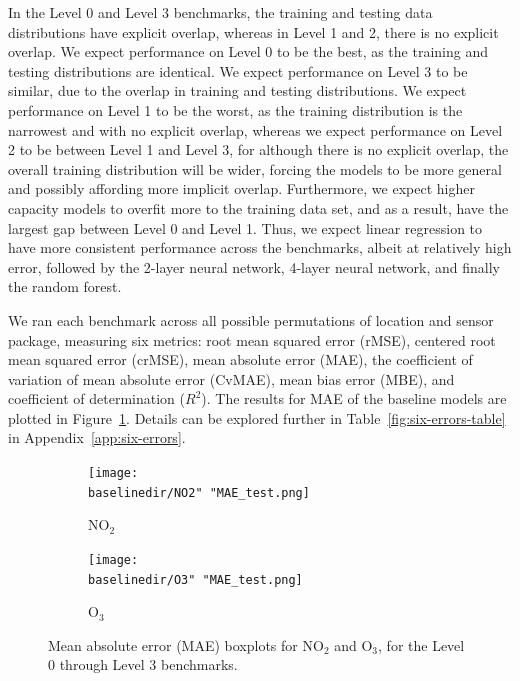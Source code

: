 \documentclass[journal abbreviation, manuscript]{copernicus}
\newcommand{\textus}[1]{$_{\text{#1}}$}
\begin{document}
In the Level 0 and Level 3 benchmarks, the training and testing data distributions have explicit overlap, whereas in Level 1 and 2, there is no explicit overlap. We expect performance on Level 0 to be the best, as the training and testing distributions are identical.  We expect performance on Level 3 to be similar, due to the overlap in training and testing distributions. We expect performance on Level 1 to be the worst, as the training distribution is the narrowest and with no explicit overlap, whereas we expect performance on Level 2 to be between Level 1 and Level 3, for although there is no explicit overlap, the overall training distribution will be wider, forcing the models to be more general and possibly affording more implicit overlap.  Furthermore, we expect higher capacity models to overfit more to the training data set, and as a result, have the largest gap between Level 0 and Level 1. Thus, we expect linear regression to have more consistent performance across the benchmarks, albeit at relatively high error, followed by the 2-layer neural network, 4-layer neural network, and finally the random forest.

We ran each benchmark across all possible permutations of location and sensor package, measuring six metrics: root mean squared error (rMSE), centered root mean squared error (crMSE), mean absolute error (MAE), the coefficient of variation of mean absolute error (CvMAE), mean bias error (MBE), and coefficient of determination ($R^2$). The results for MAE of the baseline models are plotted in Figure~\ref{fig:results-linear}.  Details can be explored further in Table~\ref{fig:six-errors-table} in Appendix~\ref{app:six-errors}.

\begin{figure}[t]
\centering
\begin{subfigure}{0.45\textwidth}
\texttt{[image: \\baselinedir/NO2" "MAE\_test.png]}
\caption{NO\textus{2}}
\end{subfigure}
\begin{subfigure}{0.45\textwidth}
\texttt{[image: \\baselinedir/O3" "MAE\_test.png]}
\caption{O\textus{3}}
\end{subfigure}
\caption{Mean absolute error (MAE) boxplots for NO\textus{2} and O\textus{3}, for the Level 0 through Level 3 benchmarks.}
\label{fig:results-linear}
\end{figure}
\end{document}
